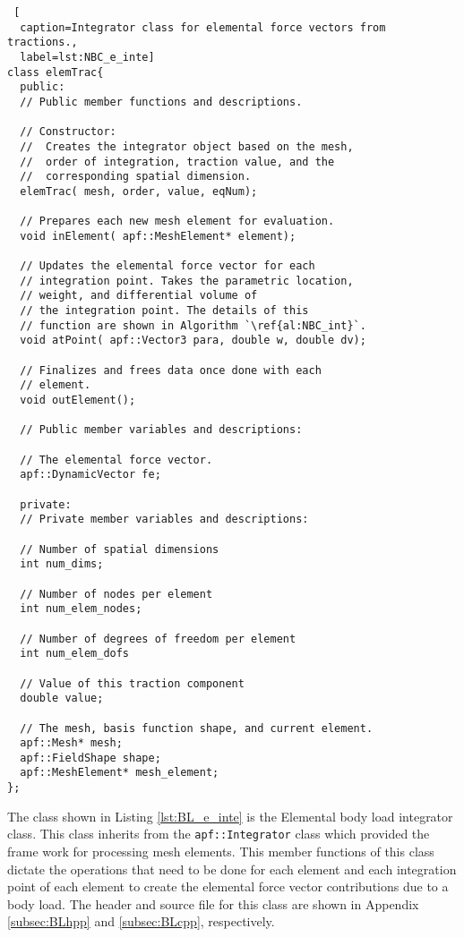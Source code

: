 \documentclass[a4paper, 12pt]{article}
\begin{document}
\begin{lstlisting} [
  caption=Integrator class for elemental force vectors from tractions.,
  label=lst:NBC_e_inte]
class elemTrac{
  public:
  // Public member functions and descriptions.

  // Constructor:
  //  Creates the integrator object based on the mesh,
  //  order of integration, traction value, and the 
  //  corresponding spatial dimension.
  elemTrac( mesh, order, value, eqNum);

  // Prepares each new mesh element for evaluation.
  void inElement( apf::MeshElement* element);

  // Updates the elemental force vector for each 
  // integration point. Takes the parametric location,
  // weight, and differential volume of 
  // the integration point. The details of this 
  // function are shown in Algorithm `\ref{al:NBC_int}`.
  void atPoint( apf::Vector3 para, double w, double dv);

  // Finalizes and frees data once done with each 
  // element.
  void outElement();

  // Public member variables and descriptions:

  // The elemental force vector.
  apf::DynamicVector fe;

  private:
  // Private member variables and descriptions:

  // Number of spatial dimensions
  int num_dims;
  
  // Number of nodes per element
  int num_elem_nodes;

  // Number of degrees of freedom per element
  int num_elem_dofs

  // Value of this traction component
  double value;

  // The mesh, basis function shape, and current element.
  apf::Mesh* mesh;
  apf::FieldShape shape;
  apf::MeshElement* mesh_element;
};
\end{lstlisting}
\vspace{\baselineskip}

The class shown in Listing 
\ref{lst:BL_e_inte} is the 
Elemental body load integrator
class.
This class inherits from the \texttt{apf::Integrator} class
which provided the frame work for processing mesh elements.
This member functions of this class dictate the operations that 
need to be done for each element and each integration point 
of each element to create the elemental force vector contributions
due to a body load.
The header and source file for this class are shown in Appendix 
\ref{subsec:BLhpp} and 
\ref{subsec:BLcpp}, 
respectively.
\end{document}
